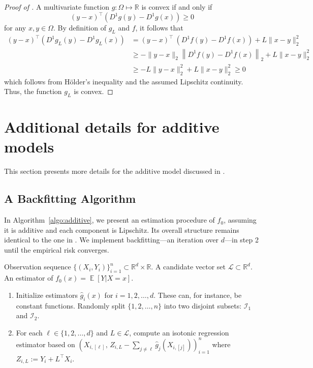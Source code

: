 \documentclass[12pt]{article}
\DeclareMathOperator*{\E}{\mathbb{E}}
\begin{document}
\begin{appendices}
\begin{proof}[Proof of ]
A multivariate function $g : \Omega\mapsto \mathbb{R}$ is convex if and only if 
\[(y-x)^{\top}\left(D^1 g(y) - D^1 g(x)\right) \ge 0\]
for any $x, y \in \Omega$. By definition of $g_L$ and $f$, it follows that 
    \begin{align*}
        (y-x)^{\top}\left(D^1 g_L(y) - D^1 g_L(x)\right) &=(y-x)^{\top}\ \left(D^1 f(y) - D^1 f(x)\right) + L \|x-y\|_2^2 \\
        &\ge - \|y-x\|_2 \left\|D^1 f(y) - D^1 f(x)\right\|_2 + L \|x-y\|_2^2 \\
        &\ge - L \|y-x\|_2^2+ L \|x-y\|_2^2  \ge 0
    \end{align*}
which follows from H\"{o}lder's inequality and the assumed Lipschitz continuity. Thus, the function $g_L$ is convex.
\end{proof}

\newpage
\section{Additional details for additive models}\label{supp:additive}
This section presents more details for the additive model discussed in . 
\subsection{A Backfitting Algorithm}\label{supp: additive algorithm}
In Algorithm~\ref{algo:additive}, we present an estimation procedure of $f_0$, assuming it is additive and each component is Lipschitz. Its overall structure remains identical to the one in . We implement backfitting---an iteration over $d$---in step 2 until the empirical risk converges. 

\begin{algorithm}
\caption{Additive Lipschitz Function Estimation using Monotone Estimators}\label{algo:additive}
\begin{algorithmic}
\Require Observation sequence $\{(X_i, Y_i)\}_{i=1}^n \subset \mathbb{R}^d \times \mathbb{R}$. A candidate vector set $\mathcal{L} \subset \mathbb{R}^d$.
\Ensure An estimator of $f_0(x) = \E[Y|X=x]$. 
\begin{enumerate}
    \item Initialize estimators $\widehat g_{i}(x)$ for $i = 1, 2, \ldots, d$. These can, for instance, be constant functions. Randomly split $\{1,2,\ldots, n\}$ into two disjoint subsets: $\mathcal{I}_1$ and $\mathcal{I}_2$.
    \item \label{step:coordinate-decent}For each $\ell \in \{1, 2, \ldots, d\}$ and $L \in \mathcal{L}$, compute an isotonic regression estimator based on $(X_{i,[\ell]}, \, Z_{i, L} -\sum_{j\neq \ell}\hat g_{j}(X_{i,[j]}))_{i=1}^n$ where $Z_{i, L} := Y_i +L^{\top} X_i$.


\end{enumerate}
\end{algorithmic}
\end{algorithm}
\end{appendices}
\end{document}
